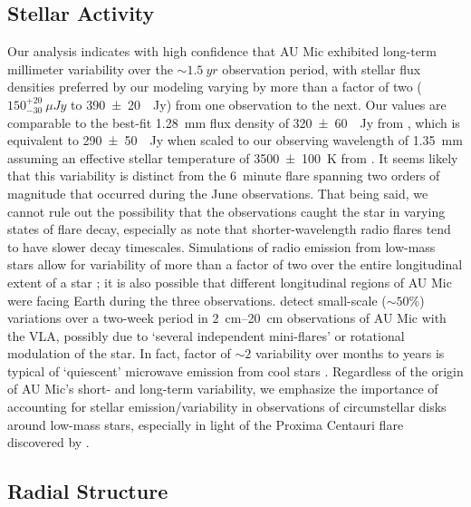 \documentclass[modern]{aastex62}
\begin{document}
\subsection{Stellar Activity}
\label{subsection: stellar activity}

Our analysis indicates with high confidence that AU Mic exhibited long-term millimeter variability over the $\sim \SI{1.5}{yr}$ observation period, with stellar
flux densities preferred by our modeling varying by more than a factor of two ($150^{+20}_{-30}~\si{\mu Jy}$ to \SI{390 \pm 20}{\mu Jy}) from one observation to the next.
Our values are comparable to the best-fit \SI{1.28}{mm} flux density of \SI{320 \pm 60}{\mu Jy} from \cite{macgregor13}, which is equivalent to \SI{290 \pm 50}{\mu Jy} when scaled to our observing wavelength of \SI{1.35}{mm} assuming an effective stellar temperature of \SI{3500 \pm 100}{K} from \cite{plavchan09}.
It seems likely that this variability is distinct from the \SI{6}{minute} flare spanning two orders of magnitude that occurred during the June observations. 
That being said, we cannot rule out the possibility that the observations caught the star in varying states of flare decay, especially as \cite{white96} note that shorter-wavelength radio flares tend to have slower decay timescales.
Simulations of radio emission from low-mass stars allow for variability of more than a factor of two over the entire longitudinal extent of a star \citep{llama18}; it is also possible that different longitudinal regions of AU Mic were facing Earth during the three observations.
\cite{cox85} detect small-scale ($\sim 50\%$) variations over  a two-week period in \SIrange{2}{20}{cm} observations of AU Mic with the VLA, possibly due to `several independent mini-flares' or rotational modulation of the star.
In fact, factor of $\sim 2$ variability over months to years is typical of `quiescent' microwave emission from cool stars \citep{guedel94}.
Regardless of the origin of AU Mic's short- and long-term variability, we emphasize the importance of accounting for stellar emission/variability in observations of circumstellar disks around low-mass stars, especially in light of the Proxima Centauri flare discovered by \cite{macgregor18}.


\subsection{Radial Structure}
\label{subsection: radial discussion}
\end{document}
